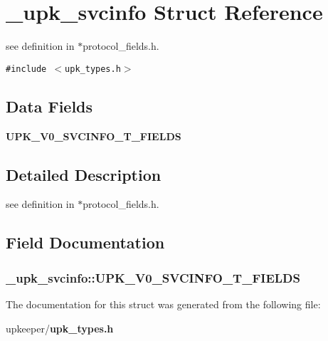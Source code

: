 \section{\_\-upk\_\-svcinfo Struct Reference}
\label{struct__upk__svcinfo}
see definition in $\ast$protocol\_\-fields.h.  


{\tt \#include $<$upk\_\-types.h$>$}

\subsection*{Data Fields}
\begin{CompactItemize}
\item 
\bf{UPK\_\-V0\_\-SVCINFO\_\-T\_\-FIELDS}
\end{CompactItemize}


\subsection{Detailed Description}
see definition in $\ast$protocol\_\-fields.h. 



\subsection{Field Documentation}
\subsubsection{\setlength{\rightskip}{0pt plus 5cm}\bf{\_\-upk\_\-svcinfo::UPK\_\-V0\_\-SVCINFO\_\-T\_\-FIELDS}}\label{struct__upk__svcinfo_b88a67dedb7b60785860f136c9ad60b1}




The documentation for this struct was generated from the following file:\begin{CompactItemize}
\item 
upkeeper/\bf{upk\_\-types.h}\end{CompactItemize}
